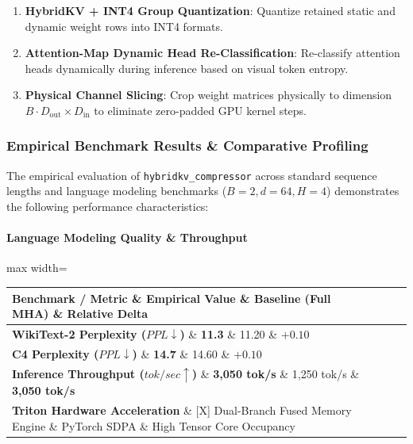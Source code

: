 \begin{enumerate}
\item \textbf{HybridKV + INT4 Group Quantization}: Quantize retained static and dynamic weight rows into INT4 formats.
\item \textbf{Attention-Map Dynamic Head Re-Classification}: Re-classify attention heads dynamically during inference based on visual token entropy.
\item \textbf{Physical Channel Slicing}: Crop weight matrices physically to dimension $B \cdot D_{\text{out}} \times D_{\text{in}}$ to eliminate zero-padded GPU kernel steps.

\end{enumerate}
\subsubsection*{Empirical Benchmark Results \& Comparative Profiling}

The empirical evaluation of \texttt{hybridkv\_compressor} across standard sequence lengths and language modeling benchmarks ($B=2, d=64, H=4$) demonstrates the following performance characteristics:

\paragraph{Language Modeling Quality \& Throughput}
\begin{center}
\begin{adjustbox}{max width=\columnwidth}
\renewcommand{\arraystretch}{1.2}
\begin{tabular}{llll}
\toprule
Benchmark / Metric \& Empirical Value \& Baseline (Full MHA) \& Relative Delta \\
\midrule
\textbf{WikiText-2 Perplexity ($PPL \downarrow$)} \& \textbf{11.3} \& 11.20 \& $+0.10$ \\
\textbf{C4 Perplexity ($PPL \downarrow$)} \& \textbf{14.7} \& 14.60 \& $+0.10$ \\
\textbf{Inference Throughput ($tok/sec \uparrow$)} \& \textbf{3,050 tok/s} \& 1,250 tok/s \& \textbf{3,050 tok/s} \\
\textbf{Triton Hardware Acceleration} \& [X] Dual-Branch Fused Memory Engine \& PyTorch SDPA \& High Tensor Core Occupancy \\

\bottomrule
\end{tabular}
\end{adjustbox}
\end{center}
